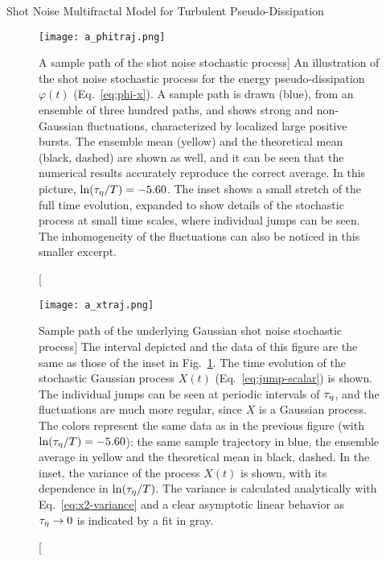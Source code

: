 \begin{chapter}{Shot Noise Multifractal Model for Turbulent Pseudo-Dissipation}
\begin{figure}[ht]
    \centering
    \texttt{[image: a\_phitraj.png]}
    \caption
    [A sample path of the shot noise stochastic process]
    {An illustration of the shot noise stochastic process for the energy pseudo-dissipation $\varphi(t)$ (Eq.~\ref{eq:phi-x}). A sample path is drawn (blue), from an ensemble of three hundred paths, and shows strong and non-Gaussian fluctuations, characterized by localized large positive bursts. The ensemble mean (yellow) and the theoretical mean (black, dashed) are shown as well, and it can be seen that the numerical results accurately reproduce the correct average.
    In this picture, $\ln(\tau_{\eta}/T) = -5.60$.
    The inset shows a small stretch of the full time evolution, expanded to show details of the stochastic process at small time scales, where individual jumps can be seen. The inhomogeneity of the fluctuations can also be noticed in this smaller excerpt.
    }
    \label{fig:phitraj}
\end{figure}

\begin{figure}[ht]
    \centering
    \texttt{[image: a\_xtraj.png]}
    \caption
    [Sample path of the underlying Gaussian shot noise stochastic process]
    {
    The interval depicted and the data of this figure are the same as those of the inset in Fig.~\ref{fig:phitraj}. The time evolution of the stochastic Gaussian process $X(t)$ (Eq.~\ref{eq:jump-scalar}) is shown. The individual jumps can be seen at periodic intervals of $\tau_{\eta}$, and the fluctuations are much more regular, since $X$ is a Gaussian process. The colors represent the same data as in the previous figure (with $\ln(\tau_{\eta}/T) = -5.60$): the same sample trajectory in blue, the ensemble average in yellow and the theoretical mean in black, dashed.
    In the inset, the variance of the process $X(t)$ is shown, with its dependence in $\ln(\tau_{\eta}/T)$. The variance is calculated analytically with Eq.~\eqref{eq:x2-variance} and a clear asymptotic linear behavior as $\tau_{\eta} \to 0$ is indicated by a fit in gray.}
    \label{fig:xtraj}
\end{figure}


\end{chapter}
